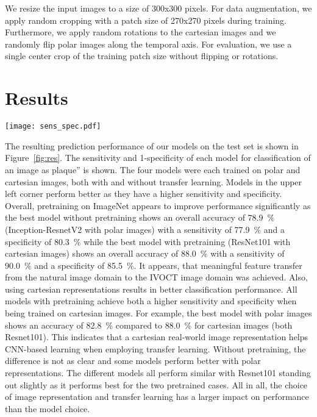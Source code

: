 We resize the input images to a size of 300x300 pixels. For data augmentation, we apply random cropping with a patch size of 270x270 pixels during training. Furthermore, we apply random rotations to the cartesian images and we randomly flip polar images along the temporal axis. For evaluation, we use a single center crop of the training patch size without flipping or rotations.

\section{Results}

\begin{figure*}
  \centering
  \texttt{[image: sens\_spec.pdf]}
\caption{The sensitivity and 1-specificity of 16 different models for binary plaque classification is shown. Each mark represents one network architecture. *’ refers to ResNet50, x’ refers to ResNet101, o’ refers to InceptionV3 and +’ refers to Inception-ResnetV2.}
\label{fig:res}       %
\end{figure*}

The resulting prediction performance of our models on the test set is shown in Figure~\ref{fig:res}. The sensitivity and 1-specificity of each model for classification of an image as plaque” is shown. The four models were each trained on polar and cartesian images, both with and without transfer learning. Models in the upper left corner perform better as they have a higher sensitivity and specificity.
Overall, pretraining on ImageNet appears to improve performance significantly as the best model without pretraining shows an overall accuracy of \SI{78.9}{\percent} (Inception-ResnetV2 with polar images) with a sensitivity of \SI{77.9}{\percent} and a specificity of \SI{80.3}{\percent} while the best model with pretraining (ResNet101 with cartesian images) shows an overall accuracy of  \SI{88.0}{\percent} with a sensitivity of \SI{90.0}{\percent} and a specificity of \SI{85.5}{\percent}. It appears, that meaningful feature transfer from the natural image domain to the IVOCT image domain was achieved.
Also, using cartesian representations results in better classification performance. All models with pretraining achieve both a higher sensitivity and specificity when being trained on cartesian images. For example, the best model with polar images shows an accuracy of \SI{82.8}{\percent} compared to \SI{88.0}{\percent} for cartesian images (both Resnet101). This indicates that a cartesian real-world image representation helps CNN-based learning when employing transfer learning. Without pretraining, the difference is not as clear and some models perform better with polar representations.
The different models all perform similar with Resnet101 standing out slightly as it performs best for the two pretrained cases. All in all, the choice of image representation and transfer learning has a larger impact on performance than the model choice.

